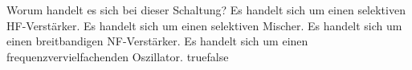     {Worum handelt es sich bei dieser Schaltung?}
    {Es handelt sich um einen selektiven HF-Verstärker.}
    {Es handelt sich um einen selektiven Mischer.}
    {Es handelt sich um einen breitbandigen NF-Verstärker.}
    {Es handelt sich um einen frequenzvervielfachenden Oszillator.}
    {true}{false}